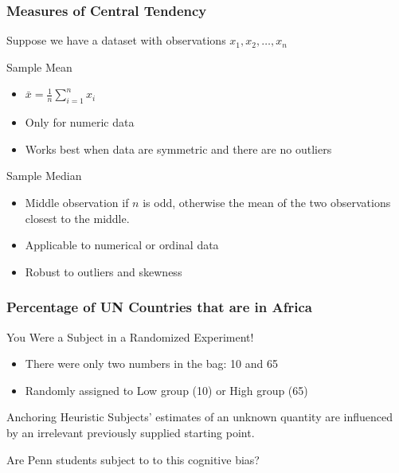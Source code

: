 \documentclass[handout]{beamer}
\begin{document}
\begin{frame}
\frametitle{Measures of Central Tendency}
Suppose we have a dataset with observations $x_1, x_2, \hdots, x_n$
	\begin{block}{Sample Mean}
		\begin{itemize}
			\item $\displaystyle\bar{x} = \frac{1}{n} \sum_{i=1}^n x_i$
			\item Only for numeric data
			\item Works best when data are symmetric and there are no outliers
		\end{itemize}
	\end{block}\pause
	\begin{block}{Sample Median}
		\begin{itemize}
		\item Middle observation if $n$ is odd, otherwise the mean of the two observations closest to the middle.
		\item Applicable to numerical or ordinal data
		\item Robust to outliers and skewness
		\end{itemize}
	\end{block}
\end{frame}
\begin{frame}
\frametitle{Percentage of UN Countries that are in Africa}
\begin{block}{You Were a Subject in a Randomized Experiment!}
	\begin{itemize}
		\item There were only two numbers in the bag: 10 and 65
		\item Randomly assigned to Low group (10) or High group (65)
	\end{itemize}
	\end{block} \pause
\begin{block}{Anchoring Heuristic \href{http://www.jstor.org/stable/1738360}{}}
	Subjects' estimates of an unknown quantity are influenced by an irrelevant previously supplied starting point.
\end{block}
\begin{alertblock}{Are Penn students subject to to this cognitive bias?}
\end{alertblock}
\end{frame}
\end{document}
